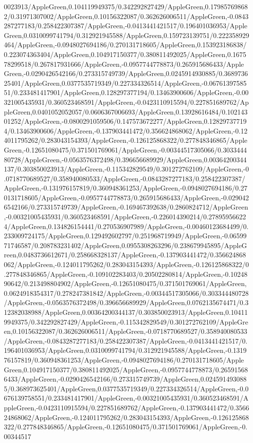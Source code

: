{\begin{tikzternal}
{0023913/AppleGreen,0.104119949375/0.342292827429/AppleGreen,0.179857698682/0.31971307002/AppleGreen,0.10156322087/0.362626006511/AppleGreen,-0.0843287277183/0.258422307387/AppleGreen,-0.0413441421517/0.196401036953/AppleGreen,0.0310099741794/0.312921945588/AppleGreen,0.159723139751/0.222358929464/AppleGreen,-0.0948027694186/0.270131718605/AppleGreen,0.153923186838/0.223074363404/AppleGreen,0.104917150377/0.380811492025/AppleGreen,0.167578299518/0.267817931666/AppleGreen,-0.0957744778873/0.265915686433/AppleGreen,-0.0290426542166/0.273315749739/AppleGreen,0.0245914930885/0.368973625401/AppleGreen,0.0377535719349/0.227334326514/AppleGreen,-0.0676139758551/0.233481417901/AppleGreen,0.128297377194/0.13463900606/AppleGreen,-0.00321005435931/0.360523468591/AppleGreen,-0.0423110915594/0.227851689762/AppleGreen,0.0401052052057/0.0606367006693/AppleGreen,0.13928616484/0.10214301252/AppleGreen,-0.0800291059506/0.147573672277/AppleGreen,0.128297377194/0.13463900606/AppleGreen,-0.137903441472/0.356624868062/AppleGreen,-0.124011795262/0.283043154393/AppleGreen,-0.126125868322/0.277848346865/AppleGreen,-0.12651080475/0.371501769061/AppleGreen,-0.00344517305066/0.303344480728/AppleGreen,-0.0563576372498/0.396656689929/AppleGreen,0.00364200344137/0.303850023913/AppleGreen,-0.115342829549/0.301272762109/AppleGreen,-0.0718770689527/0.358940080533/AppleGreen,-0.0843287277183/0.258422307387/AppleGreen,-0.131976157819/0.360948361253/AppleGreen,-0.0948027694186/0.270131718605/AppleGreen,-0.0957744778873/0.265915686433/AppleGreen,-0.0290426542166/0.273315749739/AppleGreen,-0.169467392638/0.2860824712/AppleGreen,-0.00321005435931/0.360523468591/AppleGreen,-0.226014390214/0.278959566224/AppleGreen,0.134826154441/0.270536907989/AppleGreen,-0.00460123684499/0.233009724175/AppleGreen,0.129492602797/0.251968719949/AppleGreen,-0.0659971746587/0.208783231402/AppleGreen,0.0955308263296/0.238679945895/AppleGreen,0.0483736612671/0.258668328137/AppleGreen,-0.137903441472/0.356624868062/AppleGreen,-0.124011795262/0.283043154393/AppleGreen,-0.126125868322/0.277848346865/AppleGreen,-0.109102283403/0.20502280814/AppleGreen,-0.1024890642/0.213498804902/AppleGreen,-0.12651080475/0.371501769061/AppleGreen,0.0624918354317/0.278247381842/AppleGreen,-0.00344517305066/0.303344480728/AppleGreen,-0.0563576372498/0.396656689929/AppleGreen,0.0762135674471/0.312382038988/AppleGreen,0.00364200344137/0.303850023913/AppleGreen,0.104119949375/0.342292827429/AppleGreen,-0.115342829549/0.301272762109/AppleGreen,0.10156322087/0.362626006511/AppleGreen,-0.0718770689527/0.358940080533/AppleGreen,-0.0843287277183/0.258422307387/AppleGreen,-0.0413441421517/0.196401036953/AppleGreen,0.0310099741794/0.312921945588/AppleGreen,-0.131976157819/0.360948361253/AppleGreen,-0.0948027694186/0.270131718605/AppleGreen,0.104917150377/0.380811492025/AppleGreen,-0.0957744778873/0.265915686433/AppleGreen,-0.0290426542166/0.273315749739/AppleGreen,0.0245914930885/0.368973625401/AppleGreen,0.0377535719349/0.227334326514/AppleGreen,-0.0676139758551/0.233481417901/AppleGreen,-0.00321005435931/0.360523468591/AppleGreen,-0.0423110915594/0.227851689762/AppleGreen,-0.137903441472/0.356624868062/AppleGreen,-0.124011795262/0.283043154393/AppleGreen,-0.126125868322/0.277848346865/AppleGreen,-0.12651080475/0.371501769061/AppleGreen,-0.00344517}
\end{tikzternal}}

